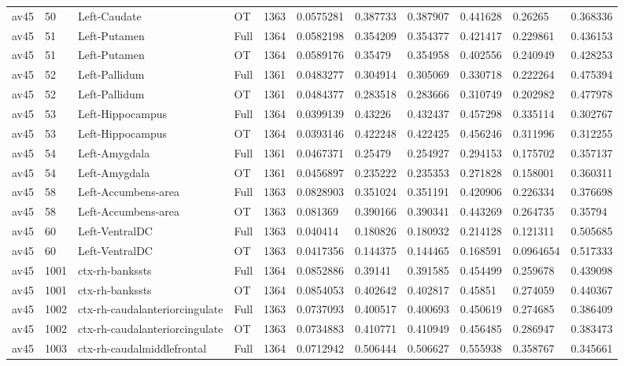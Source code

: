 \begin{landscape}
\begin{longtable}{lllllllllll}
av45 & 50 & Left-Caudate & OT & 1363 & 0.0575281 & 0.387733 & 0.387907 & 0.441628 & 0.26265 & 0.368336 \\
av45 & 51 & Left-Putamen & Full & 1364 & 0.0582198 & 0.354209 & 0.354377 & 0.421417 & 0.229861 & 0.436153 \\
av45 & 51 & Left-Putamen & OT & 1364 & 0.0589176 & 0.35479 & 0.354958 & 0.402556 & 0.240949 & 0.428253 \\
av45 & 52 & Left-Pallidum & Full & 1361 & 0.0483277 & 0.304914 & 0.305069 & 0.330718 & 0.222264 & 0.475394 \\
av45 & 52 & Left-Pallidum & OT & 1361 & 0.0484377 & 0.283518 & 0.283666 & 0.310749 & 0.202982 & 0.477978 \\
av45 & 53 & Left-Hippocampus & Full & 1364 & 0.0399139 & 0.43226 & 0.432437 & 0.457298 & 0.335114 & 0.302767 \\
av45 & 53 & Left-Hippocampus & OT & 1364 & 0.0393146 & 0.422248 & 0.422425 & 0.456246 & 0.311996 & 0.312255 \\
av45 & 54 & Left-Amygdala & Full & 1361 & 0.0467371 & 0.25479 & 0.254927 & 0.294153 & 0.175702 & 0.357137 \\
av45 & 54 & Left-Amygdala & OT & 1361 & 0.0456897 & 0.235222 & 0.235353 & 0.271828 & 0.158001 & 0.360311 \\
av45 & 58 & Left-Accumbens-area & Full & 1363 & 0.0828903 & 0.351024 & 0.351191 & 0.420906 & 0.226334 & 0.376698 \\
av45 & 58 & Left-Accumbens-area & OT & 1363 & 0.081369 & 0.390166 & 0.390341 & 0.443269 & 0.264735 & 0.35794 \\
av45 & 60 & Left-VentralDC & Full & 1363 & 0.040414 & 0.180826 & 0.180932 & 0.214128 & 0.121311 & 0.505685 \\
av45 & 60 & Left-VentralDC & OT & 1363 & 0.0417356 & 0.144375 & 0.144465 & 0.168591 & 0.0964654 & 0.517333 \\
av45 & 1001 & ctx-rh-bankssts & Full & 1364 & 0.0852886 & 0.39141 & 0.391585 & 0.454499 & 0.259678 & 0.439098 \\
av45 & 1001 & ctx-rh-bankssts & OT & 1364 & 0.0854053 & 0.402642 & 0.402817 & 0.45851 & 0.274059 & 0.440367 \\
av45 & 1002 & ctx-rh-caudalanteriorcingulate & Full & 1363 & 0.0737093 & 0.400517 & 0.400693 & 0.450619 & 0.274685 & 0.386409 \\
av45 & 1002 & ctx-rh-caudalanteriorcingulate & OT & 1363 & 0.0734883 & 0.410771 & 0.410949 & 0.456485 & 0.286947 & 0.383473 \\
av45 & 1003 & ctx-rh-caudalmiddlefrontal & Full & 1364 & 0.0712942 & 0.506444 & 0.506627 & 0.555938 & 0.358767 & 0.345661 \\

\end{longtable}
\end{landscape}
